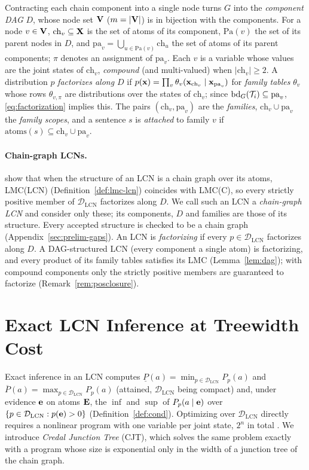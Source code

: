 \documentclass{article} %
\DeclareRobustCommand{\rev}[1]{{\color{blue}#1}}
\newcommand{\lo}{\underline}
\newcommand{\hi}{\overline}
\newcommand{\DLCN}{\mathcal{D}_{\mathrm{LCN}}}
\newcommand{\ch}{\mathrm{ch}}
\newcommand{\pa}{\mathrm{pa}}
\newcommand{\atoms}{\mathrm{atoms}}
\providecommand{\Pa}{\mathrm{Pa}}
\begin{document}
Contracting each chain component into a single node turns $G$ into the \emph{component DAG} $D$, whose node set $\mathbf{V}$ ($m=|\mathbf{V}|$) is in bijection with the components. For a node $v\in\mathbf{V}$, $\ch_v\subseteq\bX$ is the set of atoms of its component, $\Pa(v)$ the set of its parent nodes in $D$, and $\pa_v=\bigcup_{u\in\Pa(v)}\ch_u$ the set of atoms of its parent components; $\pi$ denotes an assignment of $\pa_v$. Each $v$ is a variable whose values are the joint states of $\ch_v$, \emph{compound} (and multi-valued) when $|\ch_v|\ge2$. \rev{A distribution $p$ \emph{factorizes along $D$} if $p(\bx)=\prod_v\theta_v(\bx_{\ch_v}\mid\bx_{\pa_v})$ for \emph{family tables} $\theta_v$ whose rows $\theta_{v,\pi}$ are distributions over the states of $\ch_v$; since $\mathrm{bd}_G(\cT_i)\subseteq\pa_v$, \eqref{eq:factorization} implies this. The pairs $(\ch_v,\pa_v)$ are the \emph{families}, $\ch_v\cup\pa_v$ the \emph{family scopes}, and a sentence $s$ is \emph{attached} to family $v$ if $\atoms(s)\subseteq\ch_v\cup\pa_v$.}

\paragraph{Chain-graph LCNs.} \citet{cozman23a} show that when the structure of an LCN is a chain graph over its atoms, LMC(LCN) (Definition~\ref{def:lmc-lcn}) coincides with LMC(C), so every strictly positive member of $\DLCN$ factorizes along $D$. We call such an LCN a \emph{chain-graph LCN} and consider only these; its components, $D$ and families are those of its structure. \rev{Every accepted structure is checked to be a chain graph (Appendix~\ref{sec:prelim-gaps}). An LCN is \emph{factorizing} if every $p\in\DLCN$ factorizes along $D$. A DAG-structured LCN (every component a single atom) is factorizing, and every product of its family tables satisfies its LMC (Lemma~\ref{lem:dag}); with compound components only the strictly positive members are guaranteed to factorize (Remark~\ref{rem:posclosure}).}

\section{Exact LCN Inference at Treewidth Cost}
\label{sec-cjt}

Exact inference in an LCN computes $\lo P(a)=\min_{p \in \DLCN}P_p(a)$ and
$\hi P(a)=\max_{p \in \DLCN}P_p(a)$ (attained, $\DLCN$ being compact) and, under
evidence $\mathbf{e}$ on atoms $\mathbf{E}$, the $\inf$ and $\sup$ of $P_p(a\mid\mathbf{e})$ over
$\{p\in\DLCN:p(\be)>0\}$ (Definition~\ref{def:cond}). Optimizing over $\DLCN$
directly requires a nonlinear program with one variable per joint state, $2^n$
in total \citep{marinescu2022neurips}. We introduce \emph{Credal Junction Tree}
(CJT), which solves the same problem exactly with a program whose size is
exponential only in the width of a junction tree of the chain graph.
\end{document}
